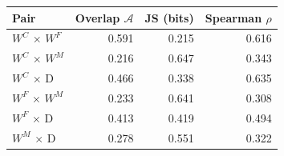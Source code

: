 \begin{tabular}{lrrr}
\toprule
Pair & Overlap $\mathcal{A}$ & JS (bits) & Spearman $\rho$ \\
\midrule
$W^C$ $\times$ $W^F$ & 0.591 & 0.215 & 0.616 \\
$W^C$ $\times$ $W^M$ & 0.216 & 0.647 & 0.343 \\
$W^C$ $\times$ D & 0.466 & 0.338 & 0.635 \\
$W^F$ $\times$ $W^M$ & 0.233 & 0.641 & 0.308 \\
$W^F$ $\times$ D & 0.413 & 0.419 & 0.494 \\
$W^M$ $\times$ D & 0.278 & 0.551 & 0.322 \\
\bottomrule
\end{tabular}